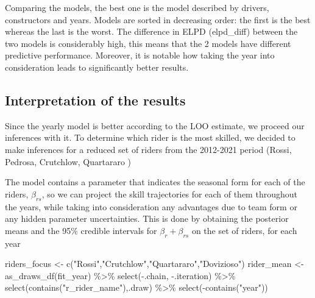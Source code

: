 \documentclass[
]{article}
\newenvironment{Shaded}{\begin{snugshade}}{\end{snugshade}}
\newcommand{\FunctionTok}[1]{\textcolor[rgb]{0.00,0.00,0.00}{#1}}
\newcommand{\NormalTok}[1]{#1}
\newcommand{\OtherTok}[1]{\textcolor[rgb]{0.56,0.35,0.01}{#1}}
\newcommand{\SpecialCharTok}[1]{\textcolor[rgb]{0.00,0.00,0.00}{#1}}
\newcommand{\StringTok}[1]{\textcolor[rgb]{0.31,0.60,0.02}{#1}}
\begin{document}
Comparing the models, the best one is the model described by drivers,
constructors and years. Models are sorted in decreasing order: the first
is the best whereas the last is the worst. The difference in ELPD
(elpd\_diff) between the two models is considerably high, this means
that the 2 models have different predictive performance. Moreover, it is
notable how taking the year into consideration leads to significantly
better results.

\hypertarget{interpretation-of-the-results}{%
\subsection{Interpretation of the
results}\label{interpretation-of-the-results}}

Since the yearly model is better according to the LOO estimate, we
proceed our inferences with it. To determine which rider is the most
skilled, we decided to make inferences for a reduced set of riders from
the 2012-2021 period (Rossi, Pedrosa, Crutchlow, Quartararo )

The model contains a parameter that indicates the seasonal form for each
of the riders, \(\beta_{rs}\), so we can project the skill trajectories
for each of them throughout the years, while taking into consideration
any advantages due to team form or any hidden parameter uncertainties.
This is done by obtaining the posterior means and the 95\% credible
intervals for \(\beta_{r} + \beta_{rs}\) on the set of riders, for each
year

\begin{Shaded}
\begin{Highlighting}[]
\NormalTok{riders\_focus }\OtherTok{\textless{}{-}} \FunctionTok{c}\NormalTok{(}\StringTok{"Rossi"}\NormalTok{,}\StringTok{"Crutchlow"}\NormalTok{,}\StringTok{"Quartararo"}\NormalTok{,}\StringTok{"Dovizioso"}\NormalTok{)}
\NormalTok{rider\_mean }\OtherTok{\textless{}{-}} \FunctionTok{as\_draws\_df}\NormalTok{(fit\_year) }\SpecialCharTok{\%\textgreater{}\%} \FunctionTok{select}\NormalTok{(}\SpecialCharTok{{-}}\NormalTok{.chain, }\SpecialCharTok{{-}}\NormalTok{.iteration) }\SpecialCharTok{\%\textgreater{}\%} \FunctionTok{select}\NormalTok{(}\FunctionTok{contains}\NormalTok{(}\StringTok{"r\_rider\_name"}\NormalTok{),.draw) }\SpecialCharTok{\%\textgreater{}\%} \FunctionTok{select}\NormalTok{(}\SpecialCharTok{{-}}\FunctionTok{contains}\NormalTok{(}\StringTok{"year"}\NormalTok{))}
\end{Highlighting}
\end{Shaded}
\end{document}
